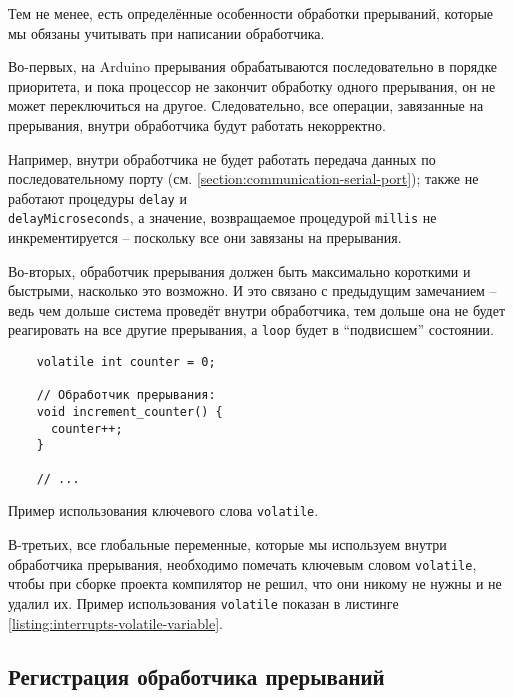 \documentclass[../sparc.tex]{subfiles}
\begin{document}
Тем не менее, есть определённые особенности обработки прерываний, которые мы
обязаны учитывать при написании обработчика.

Во-первых, на Arduino прерывания обрабатываются последовательно в порядке
приоритета, и пока процессор не закончит обработку одного прерывания, он не
может переключиться на другое.  Следовательно, все операции, завязанные на
прерывания, внутри обработчика будут работать некорректно.

Например, внутри обработчика не будет работать передача данных по
последовательному порту (см. \ref{section:communication-serial-port}); также не
работают процедуры \texttt{delay} и\\
\texttt{delayMicroseconds}, а значение, возвращаемое процедурой
\texttt{millis} не инкрементируется -- поскольку все они завязаны на
прерывания.

Во-вторых, обработчик прерывания должен быть максимально короткими и быстрыми,
насколько это возможно.  И это связано с предыдущим замечанием -- ведь чем дольше
система проведёт внутри обработчика, тем дольше она не будет реагировать на все
другие прерывания, а \texttt{loop} будет в ``подвисшем'' состоянии.

\begin{listing}[H]
  \begin{verbatim}
    volatile int counter = 0;

    // Обработчик прерывания:
    void increment_counter() {
      counter++;
    }

    // ...
  \end{verbatim}
  \caption{Пример использования ключевого слова \texttt{volatile}.}
  \label{listing:interrupts-volatile-variable}
\end{listing}

 В-третьих, все
глобальные переменные, которые мы используем внутри обработчика прерывания,
необходимо помечать ключевым словом \texttt{volatile}, чтобы при сборке
проекта компилятор не решил, что они никому не нужны и не удалил их.  Пример
использования \texttt{volatile} показан в листинге
\ref{listing:interrupts-volatile-variable}.

\subsection{Регистрация обработчика прерываний}
\end{document}

